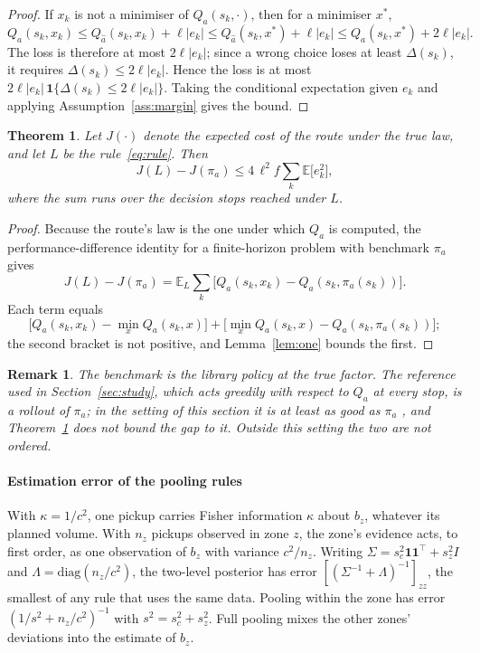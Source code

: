 \documentclass[preprint,authoryear,12pt]{elsarticle}
\newtheorem{theorem}{Theorem}
\newtheorem{remark}{Remark}
\newcommand{\E}{\mathbb{E}}
\begin{document}
\begin{proof}
If $x_k$ is not a minimiser of $Q_a(s_k,\cdot)$, then for a minimiser
$x^*$,
\[
Q_a(s_k,x_k) \le Q_{\hat a}(s_k,x_k) + \ell|e_k| \le
Q_{\hat a}(s_k,x^*) + \ell|e_k| \le Q_a(s_k,x^*) + 2\ell|e_k|.
\]
The loss
is therefore at most $2\ell|e_k|$; since a wrong choice loses at least
$\Delta(s_k)$, it requires $\Delta(s_k) \le 2\ell|e_k|$. Hence the loss
is at most $2\ell|e_k|\,\mathbf{1}\{\Delta(s_k) \le 2\ell|e_k|\}$. Taking the conditional expectation given
$e_k$ and applying Assumption~\ref{ass:margin} gives the bound.
\end{proof}

\begin{theorem}\label{thm:regret}
Let $J(\cdot)$ denote the expected cost of the route under the true
law, and let $L$ be the rule~\eqref{eq:rule}. Then
\[
J(L) - J(\pi_a) \le 4\,\ell^2 f \sum_k \E\bigl[e_k^2\bigr],
\]
where the sum runs over the decision stops reached under $L$.
\end{theorem}

\begin{proof}
Because the route's law is the one under which $Q_a$ is computed, the
performance-difference identity \citep{kakade2002approx} for a
finite-horizon problem with benchmark $\pi_a$ gives
\[
J(L) - J(\pi_a) = \E_L \sum_k \bigl[Q_a(s_k,x_k) - Q_a(s_k,\pi_a(s_k))\bigr].
\]
Each term equals
\[
\bigl[Q_a(s_k,x_k) - \min_x Q_a(s_k,x)\bigr] + \bigl[\min_x
Q_a(s_k,x) - Q_a(s_k,\pi_a(s_k))\bigr];
\]
the second bracket is not positive,
and Lemma~\ref{lem:one} bounds the first.
\end{proof}

\begin{remark}
The benchmark is the library policy at the true factor. The reference
used in Section~\ref{sec:study}, which acts greedily with respect to
$Q_a$ at every stop, is a rollout of $\pi_a$; in the setting of this
section it is at least as good as $\pi_a$ \citep{bertsekas1997rollout},
and Theorem~\ref{thm:regret} does not bound the gap to it. Outside this
setting the two are not ordered.
\end{remark}

\paragraph{Estimation error of the pooling rules} With $\kappa = 1/c^2$,
one pickup carries Fisher information $\kappa$ about $b_{z}$, whatever
its planned volume. With $n_z$ pickups observed in zone $z$, the zone's
evidence acts, to first order, as one observation of $b_z$ with variance
$c^2/n_z$. Writing $\Sigma = s_c^2\mathbf{1}\mathbf{1}^\top + s_z^2 I$
and $\Lambda = \mathrm{diag}(n_z/c^2)$, the two-level posterior has
error $[(\Sigma^{-1}+\Lambda)^{-1}]_{zz}$, the smallest of any rule that
uses the same data. Pooling within the zone has error
$(1/s^2 + n_z/c^2)^{-1}$ with $s^2 = s_c^2 + s_z^2$. Full pooling mixes
the other zones' deviations into the estimate of $b_z$.
\end{document}

